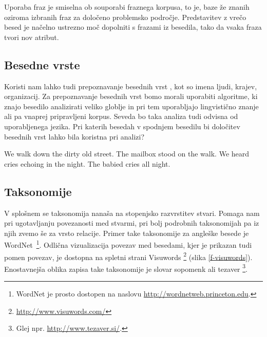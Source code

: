 Uporaba fraz je smiselna ob souporabi fraznega korpusa, to je, baze že
znanih oziroma izbranih fraz za določeno problemsko
področje. Predstavitev z vrečo besed je načelno ustrezno moč dopolniti
s frazami iz besedila, tako da vsaka fraza tvori nov atribut.

\subsection{Besedne vrste}

Koristi nam lahko tudi prepoznavanje besednih vrst
, kot so imena ljudi, krajev, organizacij. Za
prepoznavanje besednih vrst bomo morali uporabiti algoritme, ki znajo
besedilo analizirati veliko globlje in pri tem uporabljajo lingvistično
znanje ali pa vnaprej pripravljeni korpus. Seveda bo taka analiza tudi
odvisna od uporabljenega jezika. Pri katerih besedah v spodnjem
besedilu bi določitev besednih vrst lahko bila koristna pri analizi?

\begin{python}
We walk down the dirty old street.
The mailbox stood on the walk.
We heard cries echoing in the night.
The babied cries all night.
\end{python}

\subsection{Taksonomije}

V splošnem se taksonomija nanaša na stopenjsko razvrstitev
stvari. Pomaga nam pri ugotavljanju povezanosti med stvarmi, pri bolj
podrobnih taksonomijah pa iz njih zvemo še za
vrsto relacije. Primer take taksonomije za angleške besede je
WordNet~\footnote{WordNet je prosto dostopen na naslovu
  \url{http://wordnetweb.princeton.edu}.}. Odlična vizualizacija
povezav med besedami, kjer je prikazan tudi pomen povezav, je dostopna
na spletni strani Visuwords \footnote{\url{http://www.visuwords.com/}}
(slika \ref{f-visuwords}). Enostavnejša oblika zapisa take taksonomije je
slovar sopomenk ali tezaver \footnote{Glej
  npr. \url{http://www.tezaver.si/}.}.

